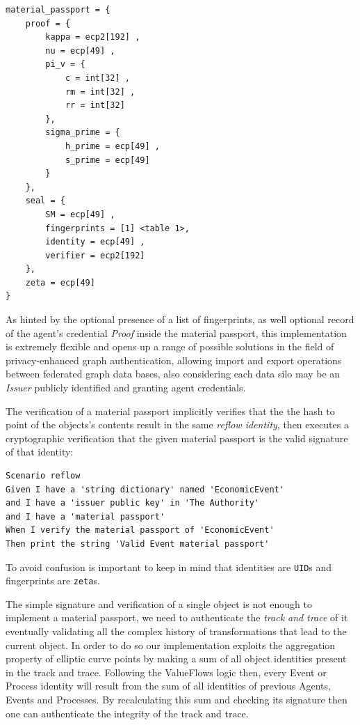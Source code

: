 \documentclass[twocolumn]{article}
\begin{document}
\begin{lstlisting}[caption={Example material passport data}]
material_passport = {
    proof = {
        kappa = ecp2[192] ,
        nu = ecp[49] ,
        pi_v = {
            c = int[32] ,
            rm = int[32] ,
            rr = int[32] 
        },
        sigma_prime = {
            h_prime = ecp[49] ,
            s_prime = ecp[49] 
        }
    },
    seal = {
        SM = ecp[49] ,
        fingerprints = [1] <table 1>,
        identity = ecp[49] ,
        verifier = ecp2[192] 
    },
    zeta = ecp[49] 
}
\end{lstlisting}

As hinted by the optional presence of a list of fingerprints, as well
optional record of the agent's credential \emph{Proof} inside the
material passport, this implementation is extremely flexible and opens
up a range of possible solutions in the field of privacy-enhanced
graph authentication, allowing import and export operations between
federated graph data bases, also considering each data silo may be an
\emph{Issuer} publicly identified and granting agent credentials.

The verification of a material passport implicitly verifies that the
the hash to point of the objects's contents result in the same
\emph{reflow identity}, then executes a cryptographic verification
that the given material passport is the valid signature of that
identity:

\begin{lstlisting}[style=zencode,caption={Verify a material passport}]
Scenario reflow
Given I have a 'string dictionary' named 'EconomicEvent'
and I have a 'issuer public key' in 'The Authority'
and I have a 'material passport'
When I verify the material passport of 'EconomicEvent'
Then print the string 'Valid Event material passport'
\end{lstlisting}

To avoid confusion is important to keep in mind that identities are
\verb!UID!s and fingerprints are \verb!zeta!s.

The simple signature and verification of a single object is not enough
to implement a material passport, we need to authenticate the
\emph{track and trace} of it eventually validating all the complex
history of transformations that lead to the current object. In order
to do so our implementation exploits the aggregation property of
elliptic curve points by making a sum of all object identities present
in the track and trace. Following the ValueFlows logic then, every
Event or Process identity will result from the sum of all identities
of previous Agents, Events and Processes. By recalculating this sum
and checking its signature then one can authenticate the integrity of
the track and trace.
\end{document}
